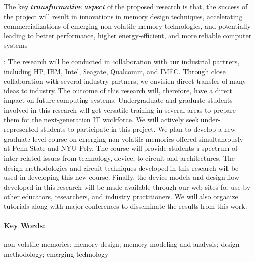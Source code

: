 \documentclass[11pt,letterpaper]{article}
\begin{document}
The key \textit{\textbf{transformative aspect}} of the proposed research is that, the success of the project will result in innovations in memory design techniques, accelerating commercializations of emerging non-volatile memory technologies, and potentially leading to better performance, higher energy-efficient, and more reliable computer systems.

{}: The research will be conducted in collaboration with our industrial partners, including HP, IBM, Intel, Seagate, Qualcomm, and IMEC. Through close collaboration with several industry partners, we envision direct transfer of many ideas to industry. The outcome of this research will, therefore, have a direct impact on future computing systems. Undergraduate and graduate students involved in this research will get versatile training in several areas to prepare them for the next-generation IT workforce. We will actively seek under-represented students to participate in this project. We plan to develop a new graduate-level course on emerging non-volatile memories offered simultaneously at Penn State and NYU-Poly. The course will provide students a spectrum of inter-related issues from technology, device, to circuit and architectures. The design methodologies and circuit techniques developed in this research will be used in developing this new course. Finally, the device models and design flow developed in this research will be made available through our web-sites for use by other educators, researchers, and industry practitioners. We will also organize tutorials along with major conferences to disseminate the results from this work.

\paragraph{\textbf{Key Words:}} non-volatile memories; memory design; memory modeling and analysis; design methodology; emerging technology
\end{document}
